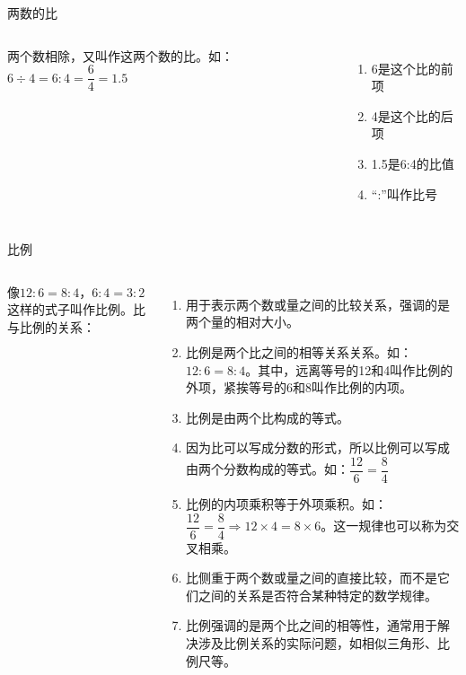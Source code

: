 \documentclass[aspectratio=169]{ctexbeamer} %
\date{\today}
\begin{document}
\begin{frame}[t]{两数的比}
\begin{columns}
两个数相除，又叫作这两个数的比。如：$6 \div 4 = 6 : 4 = \dfrac{6}{4}= 1.5$
\begin{enumerate}[label={(\arabic*).}]
\item 6是这个比的前项
\item 4是这个比的后项
\item 1.5是6:4的比值
\item “:”叫作比号
\end{enumerate}
\end{columns}
\end{frame}

\begin{frame}[t]{比例}
\begin{columns}
像$12 : 6= 8 : 4$，$6 : 4 = 3 : 2$这样的式子叫作比例。比与比例的关系：
\begin{enumerate}[label={\arabic*.}]
\item  \alert{用于表示两个数或量之间的比较关系，强调的是两个量的相对大小。}
\item 比例是两个比之间的相等关系关系。如：$12 : 6 = 8 : 4$。其中，远离等号的12和4叫作比例的外项，紧挨等号的6和8叫作比例的内项。
\item \alert{比例是由两个比构成的等式。}
\item 因为比可以写成分数的形式，所以比例可以写成由两个分数构成的等式。如：$\dfrac{12}{6} = \dfrac{8}{4}$
\item  \alert{比例的内项乘积等于外项乘积。如：$\dfrac{12}{6} = \dfrac{8}{4} \Rightarrow 12 \times 4 = 8 \times 6$。这一规律也可以称为交叉相乘。}
\item 比侧重于两个数或量之间的直接比较，而不是它们之间的关系是否符合某种特定的数学规律。
\item  \alert{比例强调的是两个比之间的相等性，通常用于解决涉及比例关系的实际问题，如相似三角形、比例尺等。}
\end{enumerate}
\end{columns}
\end{frame}
\end{document}
